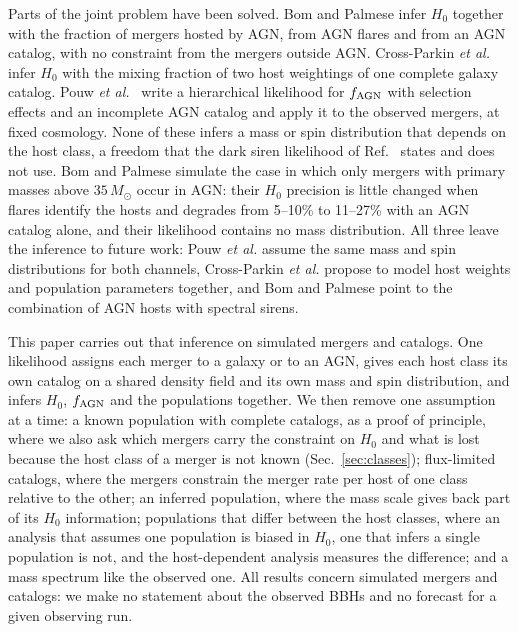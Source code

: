 \documentclass[aps,prd,reprint,twocolumn,superscriptaddress,nofootinbib,floatfix,nolongbibliography]{revtex4-2}
\newcommand{\msun}{\,M_\odot}
\newcommand{\fagn}{f_{\rm AGN}}
\begin{document}
Parts of the joint problem have been solved. Bom and Palmese
\cite{Bom:2023zgw} infer $H_0$ together with the fraction of mergers hosted
by AGN, from AGN flares and from an AGN catalog, with no constraint from the
mergers outside AGN. Cross-Parkin \textit{et
al.}~\cite{Cross-Parkin:2026pua} infer $H_0$ with the mixing fraction of two
host weightings of one complete galaxy catalog. Pouw \textit{et
al.}~\cite{Pouw:2026lar} write a hierarchical likelihood for $\fagn$ with
selection effects and an incomplete AGN catalog and apply it to the observed
mergers, at fixed cosmology. None of these infers a mass or spin
distribution that depends on the host class, a freedom that the dark siren
likelihood of Ref.~\cite{Mastrogiovanni:2023emh} states and does not use. Bom
and
Palmese simulate the case in which only mergers with primary masses above
$35\msun$ occur in AGN: their $H_0$ precision is little changed when flares
identify the hosts and degrades from 5--10\% to 11--27\% with an AGN catalog
alone, and their likelihood contains no mass distribution. All three leave
the inference to future work: Pouw \textit{et al.} assume the same mass and
spin distributions for both channels, Cross-Parkin \textit{et al.} propose to
model host weights and population parameters together, and Bom and Palmese
point to the combination of AGN hosts with spectral sirens.

This paper carries out that inference on simulated mergers and catalogs. One
likelihood assigns each merger to a galaxy or to an AGN, gives each host
class its own catalog on a shared density field and its own mass and spin
distribution, and infers $H_0$, $\fagn$ and the populations together. We
then remove one assumption at a time: a known population with complete
catalogs, as a proof of principle, where we also ask which mergers carry the
constraint on $H_0$ and what is lost because the host class of a merger is
not known (Sec.~\ref{sec:classes}); flux-limited catalogs, where the mergers
constrain the merger rate per host of one class relative to the other; an
inferred population, where the mass scale gives back part of its $H_0$
information; populations that differ between the host classes, where an
analysis that assumes one population is biased in $H_0$, one that infers a
single population is not, and the host-dependent analysis measures the
difference; and a mass spectrum like the observed one. %
All results concern simulated mergers and catalogs: we make no statement
about the observed BBHs and no forecast for a given observing run.
\end{document}
